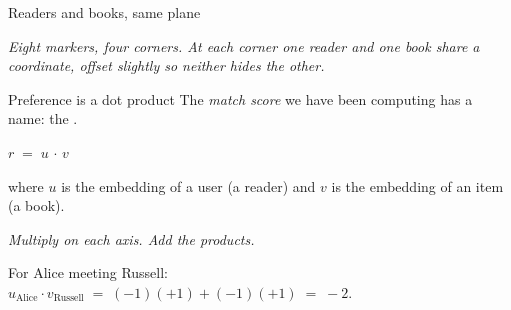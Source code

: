 \begin{frame}{Readers and books, same plane}
\begin{center}
\begin{tikzpicture}[every node/.style={inner sep=1pt}]
    \end{tikzpicture}
  \end{center}

  \medskip
  \begin{center}
    \scriptsize\itshape\color{mutedWarmGray}
    Eight markers, four corners.  At each corner one reader and one
    book share a coordinate, offset slightly so neither hides the other.
  \end{center}
\end{frame}

\begin{frame}{Preference is a dot product}
  The \emph{match score} we have been computing has a name:
  the .

  \medskip
  \begin{center}
    \Large $r \;=\; u \,\cdot\, v$
  \end{center}

  \begin{center}
    \footnotesize\color{mutedWarmGray}
    where $u$ is the embedding of a user (a reader) and
    $v$ is the embedding of an item (a book).
  \end{center}

  \smallskip
  \begin{center}
    \itshape\color{mutedWarmGray}
    Multiply on each axis.  Add the products.
  \end{center}

  \medskip
  \begin{center}
    \footnotesize
    For Alice meeting Russell:\quad
    $u_{\text{Alice}} \cdot v_{\text{Russell}}
       \;=\; (-1)(+1) + (-1)(+1) \;=\; -2.$
  \end{center}
\end{frame}

